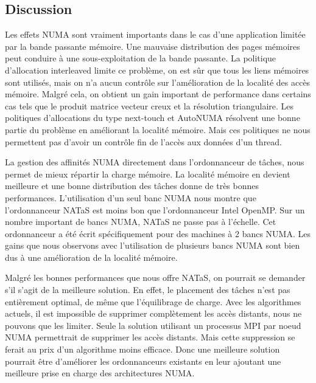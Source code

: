 \subsection{Discussion}
Les effets NUMA sont vraiment importants dans le cas d'une application limitée par la bande passante mémoire.
%
Une mauvaise distribution des pages mémoires peut conduire à une sous-exploitation de la bande passante.
%
La politique d'allocation interleaved limite ce problème, on est sûr que tous les liens mémoires sont utilisés, mais on n'a aucun contrôle sur l'amélioration de la localité des accès mémoire.
%
Malgré cela, on obtient un gain important de performance dans certains cas tels que le produit matrice vecteur creux et la résolution triangulaire.
%
Les politiques d'allocations du type next-touch et AutoNUMA résolvent une bonne partie du problème en améliorant la localité mémoire.
%
Mais ces politiques ne nous permettent pas d'avoir un contrôle fin de l'accès aux données d'un thread.

La gestion des affinités NUMA directement dans l'ordonnanceur de tâches, nous permet de mieux répartir la charge mémoire.
%
La localité mémoire en devient meilleure et une bonne distribution des tâches donne de très bonnes performances.
%
L'utilisation d'un seul banc NUMA nous montre que l'ordonnanceur NATaS est moins bon que l'ordonnanceur Intel OpenMP.
%
Sur un nombre important de bancs NUMA, NATaS ne passe pas à l'échelle.
%
Cet ordonnanceur a été écrit spécifiquement pour des machines à 2 bancs NUMA.
%
Les gains que nous observons avec l'utilisation de plusieurs bancs NUMA sont bien dus à une amélioration de la localité mémoire.

Malgré les bonnes performances que nous offre NATaS, on pourrait se demander s'il s'agit de la meilleure solution.
%
En effet, le placement des tâches n'est pas entièrement optimal, de même que l'équilibrage de charge.
%
Avec les algorithmes actuels, il est impossible de supprimer complètement les accès distants, nous ne pouvons que les limiter.
%
Seule la solution utilisant un processus MPI par noeud NUMA permettrait de supprimer les accès distants.
%
Mais cette suppression se ferait au prix d'un algorithme moins efficace.
%
Donc une meilleure solution pourrait être d'améliorer les ordonnanceurs existants en leur ajoutant une meilleure prise en charge des architectures NUMA.

